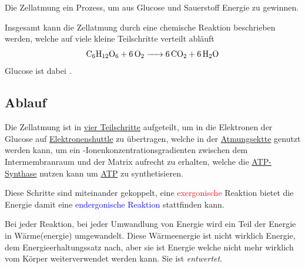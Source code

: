 \documentclass{article}
\begin{document}
 
Die Zellatmung ein Prozess, um aus Glucose und Sauerstoff Energie zu gewinnen.
 
Insgesamt kann die Zellatmung durch eine chemische Reaktion beschrieben werden, welche auf viele kleine Teilschritte verteilt abläuft 
\[
 \ce{C6H12O6 + 6O2 -> 6CO2 + 6H2O} 
\]
Glucose ist dabei .
 
\subsection{Ablauf}
Die Zellatmung ist in \hyperref[Die vier Teilschritte der Zellatmung]{vier Teilschritte} aufgeteilt, um in die Elektronen der Glucose auf \hyperref[Elektronenshuttle]{Elektronenshuttle} zu übertragen, welche in der \hyperref[Die Atmungskette]{Atmungsektte} genutzt werden kann, um ein -Ionenkonzentrationsgradienten zwischen dem Intermembranraum und der Matrix aufrecht zu erhalten, welche die \hyperref[Die ATP-Synthase]{ATP-Synthase} nutzen kann um \hyperref[ATP]{ATP} zu synthetisieren.
 
Diese Schritte sind miteinander gekoppelt, eine \textcolor{red}{exergonische} Reaktion bietet die Energie damit eine \textcolor{blue}{endergonische Reaktion} stattfinden kann.
\begin{center}
\end{center}

Bei jeder Reaktion, bei jeder Umwandlung von Energie wird ein Teil der Energie in Wärme(energie) umgewandelt. Diese Wärmeenergie ist nicht wirklich  Energie, dem Energieerhaltungssatz nach, aber sie ist Energie welche nicht mehr wirklich vom Körper weiterverwendet werden kann. Sie ist \emph{entwertet}.
 
\end{document}
